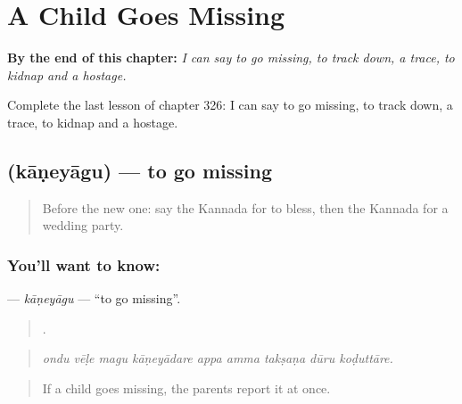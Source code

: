 
\chapter{A Child Goes Missing}
\label{ch:ka-a-child-goes-missing}

\begin{chapteropening}
\textbf{By the end of this chapter:} \emph{I can say to go missing, to track down, a trace, to kidnap and a hostage.}

Complete the last lesson of chapter 326: I can say to go missing, to track down, a trace, to kidnap and a hostage.
\end{chapteropening}

\section[\texorpdfstring{\kn{ಕಾಣೆಯಾಗು} (kāṇeyāgu)}{ಕಾಣೆಯಾಗು (kāṇeyāgu)}]{ (kāṇeyāgu) — to go missing}

\label{lesson:KA-C326-kaneyagu}



\begin{quote}
Before the new one: say the Kannada for to bless, then the Kannada for a wedding party.
\end{quote}

\subsection*{You'll want to know: }
\textbf{} — \emph{kāṇeyāgu} — \textquotedblleft{}to go missing\textquotedblright{}.

\begin{quote}
        .
\end{quote}

\begin{quote}
\emph{ondu vēḷe magu kāṇeyādare appa amma takṣaṇa dūru koḍuttāre.}
\end{quote}

\begin{quote}
If a child goes missing, the parents report it at once.
\end{quote}

